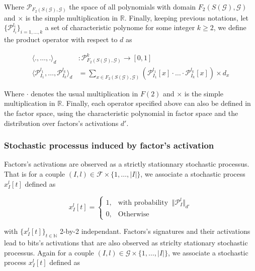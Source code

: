 \documentclass[a4paper, 11pt]{article}
\begin{document}
Where $\mathcal{P}_{F_2(S(\mathcal{G}), \mathcal{G})}$ the space of all polynomials with domain $F_2(S(\mathcal{G}), \mathcal{G})$ and $\times$ is the simple multiplication in $\mathbb{R}$. Finally, keeping previous notations, let $\lbrace \mathcal{P}_{I_{i}}^{l_i} \rbrace_{i=1, ..., k}$ a set of characteristic polynome for some integer $k \geq 2$, we define the product operator with respect to $d$ as 

\begin{align*}
\langle ., \ldots, . \rangle_{d} &: \mathcal{P}_{F_2(S(\mathcal{G}), \mathcal{G})}^{k} \rightarrow \left[ 0, 1\right] \\
\langle \mathcal{P}^{l_1}_{I_1}, \ldots,  \mathcal{P}^{l_k}_{I_k} \rangle_{d} &= \sum_{x \in F_2(S(\mathcal{G}), \mathcal{G})} \left( \mathcal{P}^{l_1}_{I_1} \left[ x \right] \cdot \ldots \cdot \mathcal{P}^{l_k}_{I_k} \left[ x \right] \right) \times d_x
\end{align*}

Where $\cdot$ denotes the usual multiplication in $F(2)$ and $\times$ is the simple multiplication in $\mathbb{R}$. Finally, each operator specified above can also be defined in the factor space, using the characteristic polynomial in factor space and the distribution over factors's activations $d'$.


\subsubsection*{Stochastic processus induced by factor's activation}

Factors's activations are observed as a strictly stationnary stochastic processus. That is for a couple $(I, l) \in \mathcal{F} \times \{1, \ldots, \vert I \vert\}$,  we associate a stochastic process $x_I^l[t]$ defined as 


\begin{equation*}
x_I^l[t] = \begin{cases} 1, & \text{with probability }\ \Vert \mathcal{P}_I^l \Vert_{d'}\\ 0, & \text{Otherwise} \end{cases}
\end{equation*}

with $\{ x_I^l[t] \}_{t\in \mathbb{N}}$ 2-by-2 independant. Factors's signatures and their activations lead to bits's activations that are also observed as striclty stationary stochastic processus. Again for a couple $(I, l) \in \mathcal{G} \times \{1, \ldots, \vert I \vert\}$,  we associate a stochastic process $x_I^l[t]$ defined as 
\end{document}
